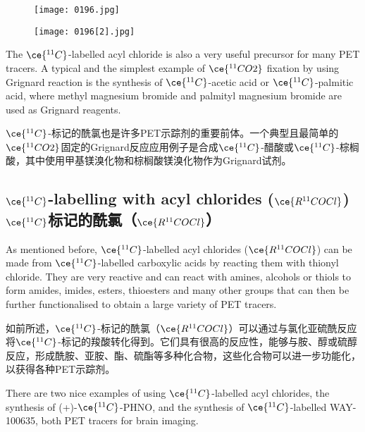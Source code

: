 \documentclass[dvipsnames, svgnames,a4paper,11pt]{article}
\begin{document}
\begin{figure}[h]
	\centering
    \texttt{[image: 0196.jpg]}  
     \label{fig233}
\end{figure}

\begin{figure}[h]
	\centering
    \texttt{[image: 0196[2].jpg]}  
     \label{fig234}
\end{figure}

The \(\ce{^{11}C}\)-labelled acyl chloride is also a very useful precursor for many PET tracers. A typical and the simplest example of \(\ce{^{11}CO2}\) fixation by using Grignard reaction is the synthesis of \(\ce{^{11}C}\)-acetic acid or \(\ce{^{11}C}\)-palmitic acid, where methyl magnesium bromide and palmityl magnesium bromide are used as Grignard reagents.

\(\ce{^{11}C}\)-标记的酰氯也是许多PET示踪剂的重要前体。一个典型且最简单的\(\ce{^{11}CO2}\)固定的Grignard反应应用例子是合成\(\ce{^{11}C}\)-醋酸或\(\ce{^{11}C}\)-棕榈酸，其中使用甲基镁溴化物和棕榈酸镁溴化物作为Grignard试剂。

\subsection{\(\ce{^{11}C}\)-labelling with acyl chlorides (\(\ce{R^{11}COCl}\)) \\ \(\ce{^{11}C}\)标记的酰氯（\(\ce{R^{11}COCl}\)）}  
As mentioned before, \(\ce{^{11}C}\)-labelled acyl chlorides (\(\ce{R^{11}COCl}\)) can be made from \(\ce{^{11}C}\)-labelled carboxylic acids by reacting them with thionyl chloride. They are very reactive and can react with amines, alcohols or thiols to form amides, imides, esters, thioesters and many other groups that can then be further functionalised to obtain a large variety of PET tracers.  

如前所述，\(\ce{^{11}C}\)-标记的酰氯（\(\ce{R^{11}COCl}\)）可以通过与氯化亚硫酰反应将\(\ce{^{11}C}\)-标记的羧酸转化得到。它们具有很高的反应性，能够与胺、醇或硫醇反应，形成酰胺、亚胺、酯、硫酯等多种化合物，这些化合物可以进一步功能化，以获得各种PET示踪剂。  

There are two nice examples of using \(\ce{^{11}C}\)-labelled acyl chlorides, the synthesis of (+)-\(\ce{^{11}C}\)-PHNO, and the synthesis of \(\ce{^{11}C}\)-labelled WAY-100635, both PET tracers for brain imaging.  
\end{document}
